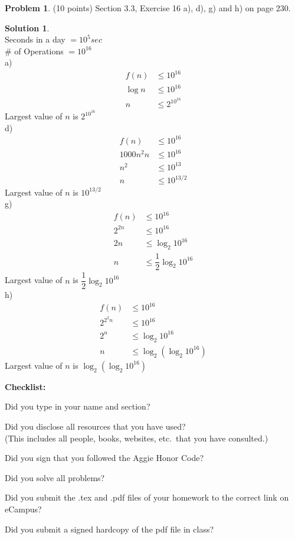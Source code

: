 \documentclass{article}
\theoremstyle{definition}
\newtheorem{problem}{Problem}
\newtheorem*{solution}{Solution}
\newcommand{\checklist}{\noindent\textbf{Checklist:}
\begin{compactitem}[$\Box$] 
\item Did you type in your name and section? 
\item Did you disclose all resources that you have used? \\
(This includes all people, books, websites, etc.\ that you have consulted.)
\item Did you sign that you followed the Aggie Honor Code? 
\item Did you solve all problems? 
\item Did you submit the .tex and .pdf files of your homework to the correct link on eCampus?
\item Did you submit a signed hardcopy of the pdf file in class? 
\end{compactitem}
}
\begin{document}
\begin{problem} (10 points) Section 3.3, Exercise 16 a), d), g) and h) on page 230.
\end{problem}
\begin{solution}\ \\
Seconds in a day $= 10^5 sec$ \\
\# of Operations $= 10^{16}$ \\
a) \\
  \begin{align*}
    f(n) &\le 10^{16} \\
    \log n &\le 10^{16} \\
    n &\le 2^{10^{16}}
  \end{align*}
  Largest value of $n$ is $2^{10^{16}}$ \\
d) \\
  \begin{align*}
    f(n) &\le 10^{16} \\
    1000 n^2 n &\le 10^{16} \\
    n^2 &\le 10^{13} \\
    n &\le 10^{13/2}
  \end{align*}
  Largest value of $n$ is $10^{13/2}$ \\
g) \\
  \begin{align*}
    f(n) &\le 10^{16} \\
    2^{2n} &\le 10^{16} \\
    2n &\le \log_2 {10^{16}} \\
    n &\le \dfrac{1}{2}  \log_2 {10^{16}}
  \end{align*}
  Largest value of $n$ is $\dfrac{1}{2}  \log_2 {10^{16}}$ \\
h) \\
  \begin{align*}
    f(n) &\le 10^{16} \\
    2^{2^2n} &\le 10^{16} \\
    2^n &\le \log_2 {10^{16}} \\
    n &\le \log_2(\log_2 {10^{16}})
  \end{align*}
  Largest value of $n$ is $\log_2(\log_2 {10^{16}})$ \\
\end{solution}

\goodbreak
\checklist
\end{document}
